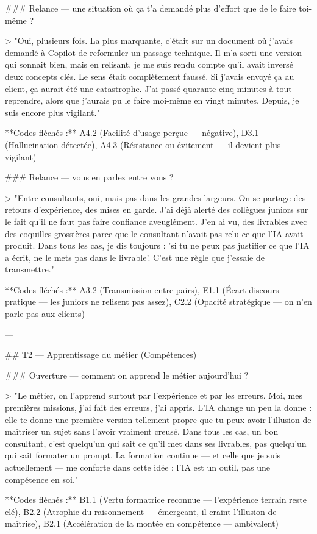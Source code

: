 ### Relance — une situation où ça t'a demandé plus d'effort que de le faire toi-même ?

> "Oui, plusieurs fois. La plus marquante, c'était sur un document où j'avais demandé à Copilot de reformuler un passage technique. Il m'a sorti une version qui sonnait bien, mais en relisant, je me suis rendu compte qu'il avait inversé deux concepts clés. Le sens était complètement faussé. Si j'avais envoyé ça au client, ça aurait été une catastrophe. J'ai passé quarante-cinq minutes à tout reprendre, alors que j'aurais pu le faire moi-même en vingt minutes. Depuis, je suis encore plus vigilant."

**Codes fléchés :** A4.2 (Facilité d'usage perçue — négative), D3.1 (Hallucination détectée), A4.3 (Résistance ou évitement — il devient plus vigilant)

### Relance — vous en parlez entre vous ?

> "Entre consultants, oui, mais pas dans les grandes largeurs. On se partage des retours d'expérience, des mises en garde. J'ai déjà alerté des collègues juniors sur le fait qu'il ne faut pas faire confiance aveuglément. J'en ai vu, des livrables avec des coquilles grossières parce que le consultant n'avait pas relu ce que l'IA avait produit. Dans tous les cas, je dis toujours : 'si tu ne peux pas justifier ce que l'IA a écrit, ne le mets pas dans le livrable'. C'est une règle que j'essaie de transmettre."

**Codes fléchés :** A3.2 (Transmission entre pairs), E1.1 (Écart discours-pratique — les juniors ne relisent pas assez), C2.2 (Opacité stratégique — on n'en parle pas aux clients)

---

## T2 — Apprentissage du métier (Compétences)

### Ouverture — comment on apprend le métier aujourd'hui ?

> "Le métier, on l'apprend surtout par l'expérience et par les erreurs. Moi, mes premières missions, j'ai fait des erreurs, j'ai appris. L'IA change un peu la donne : elle te donne une première version tellement propre que tu peux avoir l'illusion de maîtriser un sujet sans l'avoir vraiment creusé. Dans tous les cas, un bon consultant, c'est quelqu'un qui sait ce qu'il met dans ses livrables, pas quelqu'un qui sait formater un prompt. La formation continue — et celle que je suis actuellement — me conforte dans cette idée : l'IA est un outil, pas une compétence en soi."

**Codes fléchés :** B1.1 (Vertu formatrice reconnue — l'expérience terrain reste clé), B2.2 (Atrophie du raisonnement — émergeant, il craint l'illusion de maîtrise), B2.1 (Accélération de la montée en compétence — ambivalent)

